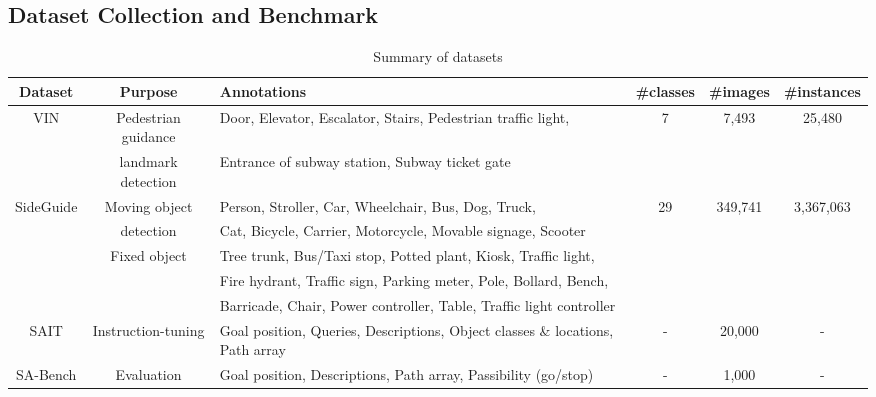 \subsection{Dataset Collection and Benchmark}
\label{sec:dataset_collection_and_benchmark}

\begin{table*}[t]
\caption{Summary of datasets}
\setlength{\tabcolsep}{5pt}
\vspace{-3mm}
\centering
\begin{tabular}{|c|c|l|c|c|c|}
\hline
\textbf{Dataset} & \textbf{Purpose} & \textbf{Annotations} &\textbf{\#classes}& \textbf{\#images} & \textbf{\#instances} \\
\hline
\multirow{2}{*}{VIN}& Pedestrian guidance& Door, Elevator, Escalator, Stairs, Pedestrian traffic light,&\multirow{2}{*}{7}&\multirow{2}{*}{7,493}&\multirow{2}{*}{25,480} \\
&landmark detection& Entrance of subway station, Subway ticket gate && & \\
\cline{1-6}
\multirow{5}{*}{SideGuide\cite{Kibaek2020}}&{Moving object}&Person, Stroller, Car, Wheelchair, Bus, Dog, Truck, &\multirow{5}{*}{29}&\multirow{5}{*}{349,741}&\multirow{5}{*}{3,367,063}\\
&detection& Cat, Bicycle, Carrier, Motorcycle, Movable signage, Scooter &&&\\
\cline{2-3}
& \multirow{2}{*}{Fixed object}& Tree trunk, Bus/Taxi stop, Potted plant, Kiosk, Traffic light,  &&&\\
&\multirow{2}{*}{detection}&Fire hydrant, Traffic sign, Parking meter, Pole, Bollard, Bench,  &&&\\
&&Barricade, Chair, Power controller, Table, Traffic light controller&&&\\
\hline
SAIT&Instruction-tuning&Goal position, Queries, Descriptions, Object classes \& locations, Path array&-&20,000&-\\
\hline
SA-Bench&Evaluation&Goal position, Descriptions, Path array, Passibility (go/stop)&-&1,000&-\\
\hline
\end{tabular}
\label{tab:dataset}
\vspace{-18pt}
\end{table*}

\vspace{-3pt}
